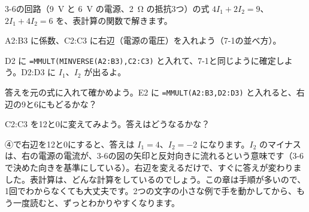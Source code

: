 \begin{yattemiyou}[表計算で連立方程式を解こう]
3-6の回路（\qty{9}{V} と \qty{6}{V} の電源、\qty{2}{\ohm} の抵抗3つ）の式 $4I_1+2I_2=9$、$2I_1+4I_2=6$ を、表計算の関数で解きます。
\begin{enumerate}[label={\bkcircled[bkGreen]{\arabic*}}, leftmargin=2.4\zw, itemsep=1pt, topsep=3pt]
\item A2:B3 に係数、C2:C3 に右辺（電源の電圧）を入れよう（7-1の並べ方）。
\item D2 に \texttt{=MMULT(MINVERSE(A2:B3),C2:C3)} と入れて、7-1と同じように確定しよう。D2:D3 に $I_1$、$I_2$ が出るよ。
\item 答えを元の式に入れて確かめよう。E2 に \texttt{=MMULT(A2:B3,D2:D3)} と入れると、右辺の9と6にもどるかな？
\item C2:C3 を12と0に変えてみよう。答えはどうなるかな？
\end{enumerate}
\begin{bkcenter}
\par\vspace{1mm}
\end{bkcenter}
\end{yattemiyou}

\noindent ④で右辺を12と0にすると、答えは $I_1=4$、$I_2=-2$ になります。$I_2$ のマイナスは、右の電源の電流が、3-6の図の矢印と反対向きに流れるという意味です（3-6で決めた向きを基準にしている）。右辺を変えるだけで、すぐに答えが変わりました。表計算は、どんな計算をしているのでしょう。この章は手順が多いので、1回でわからなくても大丈夫です。2つの文字の小さな例で手を動かしてから、もう一度読むと、ずっとわかりやすくなります。

